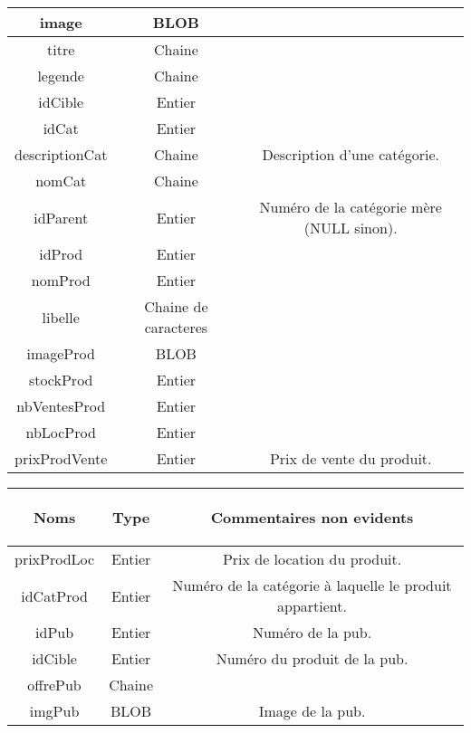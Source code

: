 \begin{tabular}{|c|c|c|}
	image & BLOB & \\
\hline
	titre & Chaine & \\
\hline
	legende & Chaine & \\
\hline
	idCible & Entier & \\
\hline
	idCat & Entier & \\
\hline
	descriptionCat & Chaine & Description d'une catégorie.\\
\hline
	nomCat & Chaine & \\
\hline
	idParent & Entier & Numéro de la catégorie mère (NULL sinon).\\
\hline
	idProd & Entier & \\
\hline
	nomProd & Entier & \\
\hline
	libelle & Chaine de caracteres & \\
\hline
	imageProd & BLOB & \\
\hline
	stockProd & Entier & \\
\hline
	nbVentesProd & Entier & \\
\hline
	nbLocProd & Entier & \\
\hline
	prixProdVente & Entier & Prix de vente du produit.\\
\hline
\end{tabular}

\newpage

\begin{tabular}{|c|c|c|}
\hline
	\begin{bf}Noms\end{bf} &
	\begin{bf}Type\end{bf} &
	\begin{bf}Commentaires non evidents\end{bf}\\
\hline
	prixProdLoc & Entier & Prix de location du produit.\\
\hline
	idCatProd & Entier & Numéro de la catégorie à laquelle le produit appartient.\\
\hline
	idPub & Entier & Numéro de la pub.\\
\hline
	idCible & Entier & Numéro du produit de la pub.\\
\hline
	offrePub & Chaine & \\
\hline
	imgPub & BLOB & Image de la pub.\\
\hline
\end{tabular}
